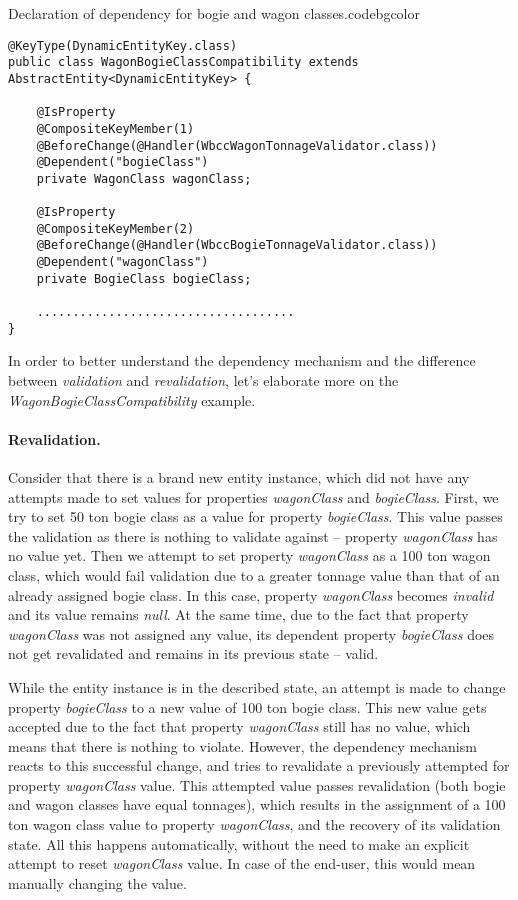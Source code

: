   \begin{code}{Declaration of dependency for bogie and wagon classes.}{\label{lst:WagonBogieClassificationCompatibilityDependency}}{codebgcolor}
    \begin{lstlisting}
@KeyType(DynamicEntityKey.class)
public class WagonBogieClassCompatibility extends AbstractEntity<DynamicEntityKey> {

    @IsProperty
    @CompositeKeyMember(1)
    @BeforeChange(@Handler(WbccWagonTonnageValidator.class))
    @Dependent("bogieClass")
    private WagonClass wagonClass;

    @IsProperty
    @CompositeKeyMember(2)
    @BeforeChange(@Handler(WbccBogieTonnageValidator.class))
    @Dependent("wagonClass")
    private BogieClass bogieClass;

    ....................................
}
    \end{lstlisting}
  \end{code}
  
  In order to better understand the dependency mechanism and the difference between \emph{validation} and \emph{revalidation}, let's elaborate more on the \emph{WagonBogieClassCompatibility} example.
  
  \paragraph*{Revalidation.}
  Consider that there is a brand new entity instance, which did not have any attempts made to set values for properties \emph{wagonClass} and \emph{bogieClass}.
  First, we try to set 50 ton bogie class as a value for property \emph{bogieClass}.
  This value passes the validation as there is nothing to validate against -- property \emph{wagonClass} has no value yet.
  Then we attempt to set property \emph{wagonClass} as a 100 ton wagon class, which would fail validation due to a greater tonnage value than that of an already assigned bogie class.
  In this case, property \emph{wagonClass} becomes \emph{invalid} and its value remains \emph{null}.
  At the same time, due to the fact that property \emph{wagonClass} was not assigned any value, its dependent property \emph{bogieClass} does not get revalidated and remains in its previous state -- valid.
 
  While the entity instance is in the described state, an attempt is made to change property \emph{bogieClass} to a new value of 100 ton bogie class.
  This new value gets accepted due to the fact that property \emph{wagonClass} still has no value, which means that there is nothing to violate.
  However, the dependency mechanism reacts to this successful change, and tries to revalidate a previously attempted for property \emph{wagonClass} value.
  This attempted value passes revalidation (both bogie and wagon classes have equal tonnages), which results in the assignment of a 100 ton wagon class value to property \emph{wagonClass}, and the recovery of its validation state.
  All this happens automatically, without the need to make an explicit attempt to reset \emph{wagonClass} value.
  In case of the end-user, this would mean manually changing the value.

